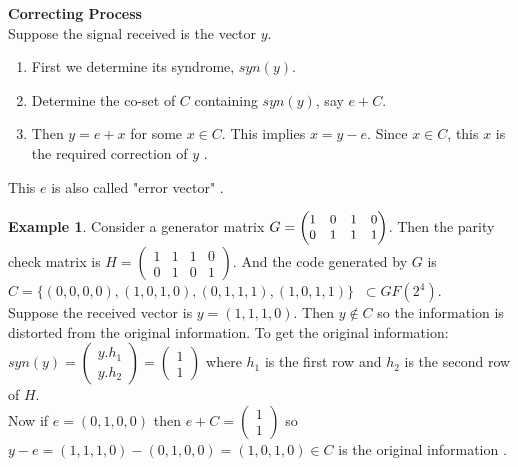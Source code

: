 \documentclass[11pt]{amsart}
\theoremstyle{plain}
\theoremstyle{definition}
\newtheorem{example}[theorem]{Example}
\numberwithin{equation}{section}
\begin{document}
\vspace{4mm}

\textbf{Correcting Process}\\
Suppose the signal received is the vector \(y\).
\begin{enumerate}
\item First we determine its syndrome, \(syn(y)\).
\item Determine the co-set of \(C\) containing \(syn(y)\), say \(e + C\).
\item Then \(y=e+x\) for some \(x \in C\). This implies \(x=y-e\). Since \(x \in C\), this \(x\) is the required correction of \(y\) \cite{error_correct}.
\end{enumerate}
This \(e\) is also called "error vector" \cite{error_correct}.

\begin{example}
  Consider a generator matrix \( \small G=\begin{pmatrix}
    1 & 0 & 1 & 0\\
    0 & 1 & 1 & 1
  \end{pmatrix}\). Then the parity check matrix is \(H=\begin{pmatrix}
    1 & 1 & 1 & 0\\
    0 & 1 & 0 & 1
  \end{pmatrix}\). And the code generated by \(G\) is \\ \(C=\{(0,0,0,0),(1,0,1,0),(0,1,1,1),(1,0,1,1)\} \;\; \subset GF(2^{4})\).\\

  Suppose the received vector is \(y=(1,1,1,0)\). Then \(y \not \in C\) so the information is distorted from the original information. To get the original information:\\
  \(syn(y)= \begin{pmatrix}
    y.h_1 \\ y.h_2
  \end{pmatrix} = \begin{pmatrix}
    1 \\ 1
  \end{pmatrix}\) where \(h_1\) is the first row and \(h_2\) is the second row of \(H\).\\
  Now if \(e=(0,1,0,0)\) then \(e+C=\begin{pmatrix}
    1 \\ 1
  \end{pmatrix}\) so \(y-e=(1,1,1,0)-(0,1,0,0)=(1,0,1,0) \in C\) is the original information \cite{error_correct}.
\end{example}
\end{document}
